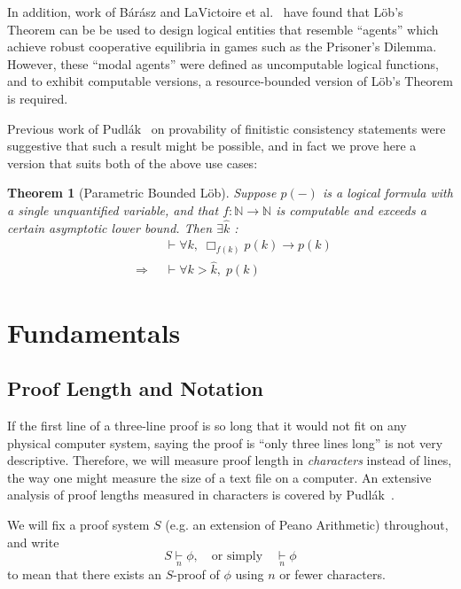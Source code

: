 \documentclass[onecolumn]{miri-tech-article}
\newtheorem*{theorem*}{Theorem}
\numberwithin{equation}{section}
\theoremstyle{definition}
\newcommand{\NN}{\mathbb{N}}
\newcommand{\proves}[1]{\underset{#1}{\vdash}}
\newcommand{\bx}[1]{\Box_{#1}}
\renewcommand{\implies}{\rightarrow}
\renewcommand{\to}{\rightarrow}
\newcommand{\Implies}{\;\;\Rightarrow\;\;}
\renewcommand{\-}{^{-1}}
\begin{document}
In addition, work of B\'{a}r\'{a}sz and LaVictoire et al.~\cite{Barasz:2014:RobustCooperation}\cite{LaVictoire:2014:PrisDilemmaLob} have found that L\"{o}b's Theorem can be be used to design logical entities that resemble ``agents'' which achieve robust cooperative equilibria in games such as the Prisoner's Dilemma.  However, these ``modal agents'' were defined as uncomputable logical functions, and to exhibit computable versions, a resource-bounded version of L\"{o}b's Theorem is required.

Previous work of Pudl\'{a}k~\cite{Pudlak:1998} on provability of finitistic consistency statements were suggestive that such a result might be possible, and in fact we prove here a version that suits both of the above use cases:

\begin{theorem*}[Parametric Bounded L\"{o}b]
Suppose $p(-)$ is a logical formula with a single unquantified variable, and that $f:\NN \to \NN$ is computable and  exceeds a certain asymptotic lower bound.  Then $\exists\hat k$ :
\begin{align*}
             &\proves{} \forall k,\; \bx{f(k)}p(k) \implies p(k)\\
\Implies &\proves{} \forall k>\hat k, \; p(k)
\end{align*}
\end{theorem*}



\section{Fundamentals}

\subsection{Proof Length and Notation}
If the first line of a three-line proof is so long that it would not fit on any physical computer system, saying the proof is ``only three lines long'' is not very descriptive.  Therefore, we will measure proof length in {\em characters} instead of lines, the way one might measure the size of a text file on a computer.  An extensive analysis of proof lengths measured in characters is covered by Pudl\'{a}k~\cite{Pudlak:1998}.

We will fix a proof system $S$ (e.g. an extension of Peano Arithmetic) throughout, and write
$$S \proves{n} \phi, \quad \text{or simply} \quad \proves{n} \phi$$
to mean that there exists an $S$-proof of $\phi$ using $n$ or fewer characters.  
\end{document}
